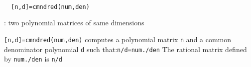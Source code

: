 
\begin{mandesc}
   \\ %
\end{mandesc}
\begin{calling_sequence}
\begin{verbatim}
  [n,d]=cmndred(num,den)  
\end{verbatim}
\end{calling_sequence}
\begin{parameters}
  \begin{varlist}
    : two polynomial matrices of same dimensions
  \end{varlist}
\end{parameters}
\begin{mandescription}
  \verb![n,d]=cmndred(num,den)! computes a polynomial matrix
  \verb!n! and a common denominator polynomial \verb!d!
  such that:\verb!n/d=num./den!
  The rational matrix defined by \verb!num./den! is \verb!n/d!
\end{mandescription}
\begin{manseealso}
     
\end{manseealso}
